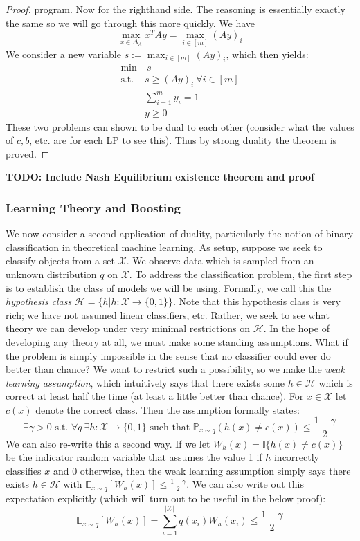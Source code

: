 \documentclass[12pt]{article}
\newcommand*{\abs}[1]{\left\lvert#1\right\rvert}
\newcommand{\E}{\mathbb{E}}
\newcommand{\Prob}{\mathbb{P}}
\begin{document}
\begin{proof}
program. Now for the righthand side. The reasoning is essentially exactly the same so we will go through this more quickly. We have 
\[ \max_{x \in \Delta_A} x^T A y = \max_{i \in [m]} (Ay)_i\]
We consider a new variable $s := \max_{i \in [m]} (Ay)_i$, which then yields: 
\begin{align*}
\min & \ s \\
\text{s.t. } &s \geq (Ay)_i \ \forall i \in [m]  \\
&\sum_{i = 1}^{m} y_i = 1 \\
&y \geq 0
\end{align*}
These two problems can shown to be dual to each other (consider what the values of $c, b$, etc. are for each LP to see this). Thus by strong duality the theorem is proved. 
\end{proof}

\textbf{TODO: Include Nash Equilibrium existence theorem and proof}


\subsubsection{Learning Theory and Boosting}
We now consider a second application of duality, particularly the notion of binary classification in theoretical machine learning. As setup, suppose we seek to classify objects from a set
$\mathcal{X}$. We observe data which is sampled from an unknown distribution $q$ on $\mathcal{X}$. To address the classification problem, the first step is to establish the class of 
models we will be using. Formally, we call this the \textit{hypothesis class} $\mathcal{H} = \{h | h: \mathcal{X} \to \{0, 1\}\}$. Note that this hypothesis class is very rich; we have not assumed 
linear classifiers, etc. Rather, we seek to see what theory we can develop under very minimal restrictions on $\mathcal{H}$. In the hope of developing any theory at all, we must make some standing 
assumptions. What if the problem is simply impossible in the sense that no classifier could ever do better than chance? We want to restrict such a possibility, so we make the \textit{weak learning assumption}, 
which intuitively says that there exists some $h \in \mathcal{H}$ which is correct at least half the time (at least a little better than chance). For $x \in \mathcal{X}$ let $c(x)$ denote the correct class. Then the 
assumption formally states: 
\[\exists \gamma > 0 \text{ s.t. } \forall q \ \exists h: \mathcal{X} \to \{0, 1\} \text{ such that } \Prob_{x \sim q}\left(h(x) \neq c(x)\right) \leq \frac{1 - \gamma}{2}\]
We can also re-write this a second way. If we let $W_{h}(x) = \mathbb{I}\{h(x) \neq c(x)\}$ be the indicator random variable that assumes the value 1 if $h$ incorrectly classifies $x$ and $0$ otherwise, then 
the weak learning assumption simply says there exists $h \in \mathcal{H}$ with $\E_{x \sim q} [W_h(x)] \leq \frac{1 - \gamma}{2}$. We can also write out this expectation explicitly (which will turn out to be useful
in the below proof): 
\[\E_{x \sim q} [W_h(x)] = \sum_{i = 1}^{\abs{\mathcal{X}}} q(x_i) W_h(x_i) \leq \frac{1 - \gamma}{2}\] 
\end{document}
